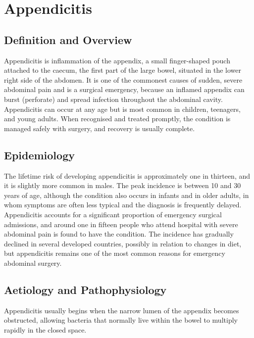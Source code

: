\chapter{Appendicitis}

\section*{Definition and Overview}
Appendicitis is inflammation of the appendix, a small finger-shaped pouch attached to the caecum, the first part of the large bowel, situated in the lower right side of the abdomen. It is one of the commonest causes of sudden, severe abdominal pain and is a surgical emergency, because an inflamed appendix can burst (perforate) and spread infection throughout the abdominal cavity. Appendicitis can occur at any age but is most common in children, teenagers, and young adults. When recognised and treated promptly, the condition is managed safely with surgery, and recovery is usually complete.

\section*{Epidemiology}
The lifetime risk of developing appendicitis is approximately one in thirteen, and it is slightly more common in males. The peak incidence is between 10 and 30 years of age, although the condition also occurs in infants and in older adults, in whom symptoms are often less typical and the diagnosis is frequently delayed. Appendicitis accounts for a significant proportion of emergency surgical admissions, and around one in fifteen people who attend hospital with severe abdominal pain is found to have the condition. The incidence has gradually declined in several developed countries, possibly in relation to changes in diet, but appendicitis remains one of the most common reasons for emergency abdominal surgery.

\section*{Aetiology and Pathophysiology}
Appendicitis usually begins when the narrow lumen of the appendix becomes obstructed, allowing bacteria that normally live within the bowel to multiply rapidly in the closed space.

